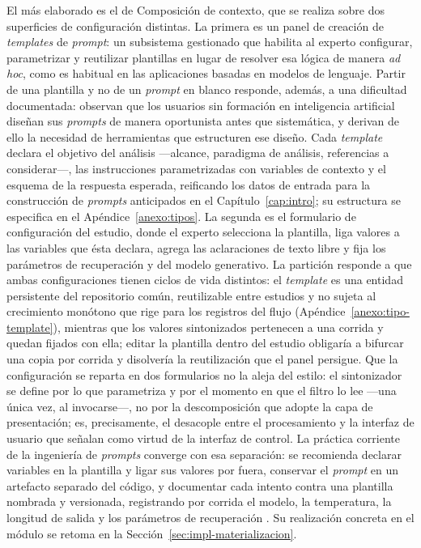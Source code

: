 \documentclass[12pt]{report}
\begin{document}
El más elaborado es el de Composición de contexto, que se realiza sobre dos superficies de configuración distintas. La primera es un panel de creación de \textit{templates} de \textit{prompt}: un subsistema gestionado que habilita al experto configurar, parametrizar y reutilizar plantillas en lugar de resolver esa lógica de manera \textit{ad hoc}, como es habitual en las aplicaciones basadas en modelos de lenguaje. Partir de una plantilla y no de un \textit{prompt} en blanco responde, además, a una dificultad documentada: \citet{zamfirescu2023} observan que los usuarios sin formación en inteligencia artificial diseñan sus \textit{prompts} de manera oportunista antes que sistemática, y derivan de ello la necesidad de herramientas que estructuren ese diseño. Cada \textit{template} declara el objetivo del análisis ---alcance, paradigma de análisis, referencias a considerar---, las instrucciones parametrizadas con variables de contexto y el esquema de la respuesta esperada, reificando los datos de entrada para la construcción de \textit{prompts} anticipados en el Capítulo~\ref{cap:intro}; su estructura se especifica en el Apéndice~\ref{anexo:tipos}. La segunda es el formulario de configuración del estudio, donde el experto selecciona la plantilla, liga valores a las variables que ésta declara, agrega las aclaraciones de texto libre y fija los parámetros de recuperación y del modelo generativo. La partición responde a que ambas configuraciones tienen ciclos de vida distintos: el \textit{template} es una entidad persistente del repositorio común, reutilizable entre estudios y no sujeta al crecimiento monótono que rige para los registros del flujo (Apéndice~\ref{anexo:tipo-template}), mientras que los valores sintonizados pertenecen a una corrida y quedan fijados con ella; editar la plantilla dentro del estudio obligaría a bifurcar una copia por corrida y disolvería la reutilización que el panel persigue. Que la configuración se reparta en dos formularios no la aleja del estilo: el sintonizador se define por lo que parametriza y por el momento en que el filtro lo lee ---una única vez, al invocarse---, no por la descomposición que adopte la capa de presentación; es, precisamente, el desacople entre el procesamiento y la interfaz de usuario que \citet{garlanshaw:1994} señalan como virtud de la interfaz de control. La práctica corriente de la ingeniería de \textit{prompts} converge con esa separación: se recomienda declarar variables en la plantilla y ligar sus valores por fuera, conservar el \textit{prompt} en un artefacto separado del código, y documentar cada intento contra una plantilla nombrada y versionada, registrando por corrida el modelo, la temperatura, la longitud de salida y los parámetros de recuperación \citep{prompt-eng:2024}. Su realización concreta en el módulo se retoma en la Sección~\ref{sec:impl-materializacion}.
\end{document}
